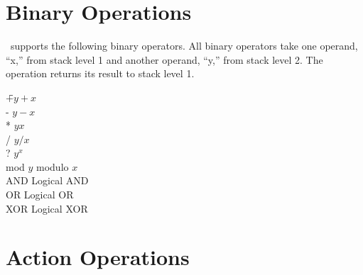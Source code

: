 \documentclass{report}
\begin{document}
\chapter{Binary Operations}

\CLAC\ supports the following binary operators. All binary operators take one operand, ``x,''
from stack level 1 and another operand, ``y,'' from stack level 2. The operation returns its
result to stack level 1.

\begin{tabbing}
\hspace*{3em}\=+\hspace{3em}\=$y + x$\\
\>             -\>            $y - x$\\
\>             *\>            $y   x$\\
\>             /\>            $y / x$\\
\>             ?\>            $y^{x}$\\
\>             mod\>          $y$ modulo $x$\\
\>             AND\>          Logical AND\\
\>             OR\>           Logical OR\\
\>             XOR\>          Logical XOR\\
\end{tabbing}

\chapter{Action Operations}
\end{document}
